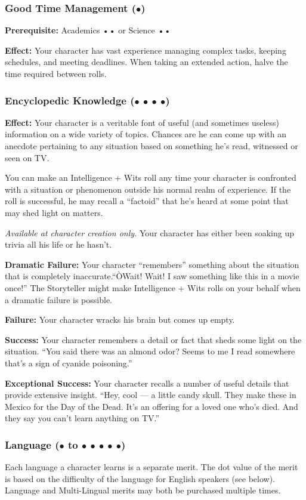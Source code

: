 \documentclass["../Misguided by Starlight.tex"]{subfiles}
\begin{document}
	\subsubsection{Good Time Management ($\bullet$)} %
		\textbf{Prerequisite:} Academics •• or Science ••
		
		\textbf{Effect:} Your character has vast experience managing complex tasks, keeping schedules, and meeting deadlines. When taking an extended action, halve the time required between rolls.
		
	\subsubsection{Encyclopedic Knowledge ($\bullet$ $\bullet$ $\bullet$ $\bullet$)} %
		\textbf{Effect:} Your character is a veritable font of useful (and sometimes useless) information on a wide variety of topics. Chances are he can come up with an anecdote pertaining to any situation based on something he's read, witnessed or seen on TV.
		
		You can make an Intelligence + Wits roll any time your character is confronted with a situation or phenomenon outside his normal realm of experience. If the roll is successful, he may recall a ``factoid'' that he's heard at some point that may shed light on matters.
		
		\emph{Available at character creation only.} Your character has either been soaking up trivia all his life or he hasn't.
		
		\textbf{Dramatic Failure:} Your character ``remembers'' something about the situation that is completely inaccurate.``ÒWait! Wait! I saw something like this in a movie once!'' The Storyteller might make Intelligence + Wits rolls on your behalf when a dramatic failure is possible.
		
		\textbf{Failure:} Your character wracks his brain but comes up empty.
		
		\textbf{Success:} Your character remembers a detail or fact that sheds some light on the situation. ``You said there was an almond odor? Seems to me I read somewhere that's a sign of cyanide poisoning.''
		
		\textbf{Exceptional Success:} Your character recalls a number of useful details that provide extensive insight. ``Hey, cool --- a little candy skull. They make these in Mexico for the Day of the Dead. It's an offering for a loved one who's died. And they say you can't learn anything on TV.''
	
	\subsubsection{Language ($\bullet$ to $\bullet$ $\bullet$ $\bullet$ $\bullet$ $\bullet$)} %
		Each language a character learns is a separate merit. The dot value of the merit is based on the difficulty of the language for English speakers (see below). Language and Multi-Lingual merits may both be purchased multiple times.
\end{document}
